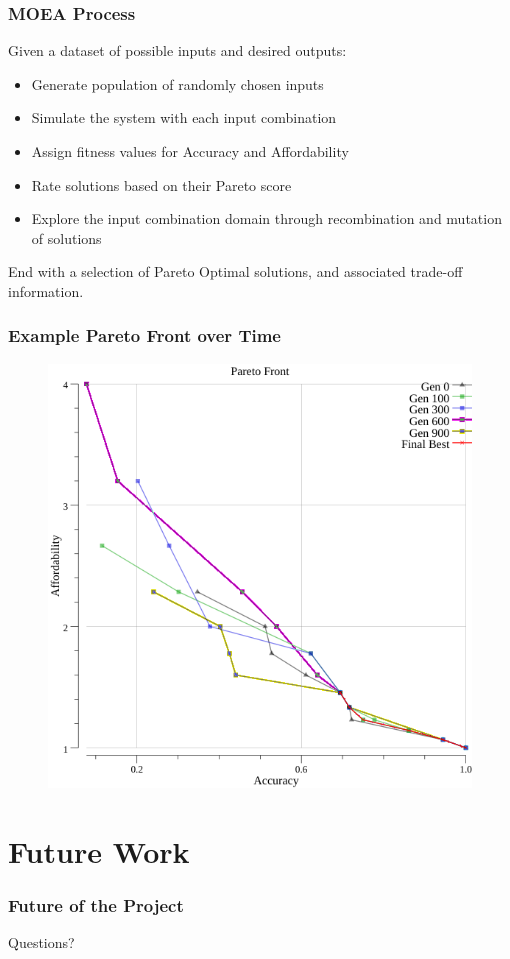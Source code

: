 \documentclass{beamer}
\begin{document}
\begin{frame}
\frametitle{MOEA Process}
Given a dataset of possible inputs and desired outputs:
\begin{itemize}
\item Generate population of randomly chosen inputs\pause
\item Simulate the system with each input combination\pause
\item Assign fitness values for Accuracy and Affordability\pause
\item Rate solutions based on their Pareto score\pause
\item Explore the input combination domain through recombination and mutation of solutions
\end{itemize}
End with a selection of Pareto Optimal solutions, and associated trade-off information.
\end{frame}

\begin{frame}
\frametitle{Example Pareto Front over Time}
\begin{figure}
\includegraphics[width=0.6\linewidth]{points.png}
\end{figure}
\end{frame}

\section{Future Work}
\begin{frame}
\frametitle{Future of the Project}

\end{frame}

\begin{frame}
\Huge{\centerline{Questions?}}
\end{frame}
\end{document}
